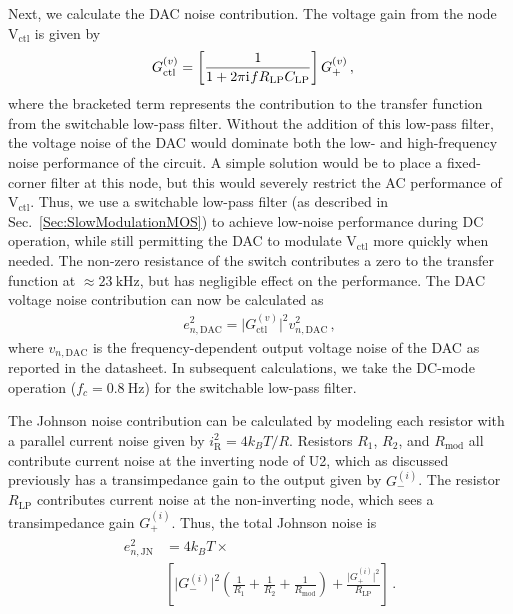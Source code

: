 \documentclass[aip,rsi,reprint]{revtex4-1} %
\newcommand{\iu}{\mathrm{i}\mkern1mu}
\begin{document}
Next, we calculate the DAC noise contribution.
The voltage gain from the node $\text{V}_{\text{ctl}}$ is given by
\begin{align}
\label{Eq:Gdc}
G^{(v)}_{\text{ctl}} &= \left[\frac{1}{1+2\pi \iu f R_\text{LP} C_\text{LP}}\right]G_{+}^{(v)}\,,
\end{align}
where the bracketed term represents the contribution to the transfer function from the switchable low-pass filter.
Without the addition of this low-pass filter, the voltage noise of the DAC would dominate both the low- and high-frequency noise performance of the circuit.
A simple solution would be to place a fixed-corner filter at this node, but this would severely restrict the AC performance of $\text{V}_\text{ctl}$.
Thus, we use a switchable low-pass filter (as described in Sec.~\ref{Sec:SlowModulationMOS}) to achieve low-noise performance during DC operation, while still permitting the DAC to modulate $\text{V}_\text{ctl}$ more quickly when needed.
The non-zero resistance of the switch contributes a zero to the transfer function at $\approx\SI{23}{\kilo\hertz}$, but has negligible effect on the performance.
The DAC voltage noise contribution can now be calculated as 
\begin{align}
e^2_{n,\text{DAC}} = \big|G^{(v)}_{\text{ctl}}\big|^2 v^2_{n,\text{DAC}}\,,
\end{align}
where $v_{n,\text{DAC}}$ is the frequency-dependent output voltage noise of the DAC as reported in the datasheet.\cite{AD56XXRDatasheet} 
In subsequent calculations, we take the DC-mode operation ($f_c = \SI{0.8}{\hertz}$) for the switchable low-pass filter.
 
The Johnson noise contribution can be calculated by modeling each resistor with a parallel current noise given by $i_\text{R}^2 = 4k_B T/R$.
Resistors $R_1$, $R_2$, and $R_\text{mod}$ all contribute current noise at the inverting node of U2, which as discussed previously has a transimpedance gain to the output given by $G_{-}^{(i)}$.
The resistor $R_\text{LP}$ contributes current noise at the non-inverting node, which sees a transimpedance gain $G_{+}^{(i)}$.
Thus, the total Johnson noise is
\begin{align}
\begin{split}
e^2_{n,\text{JN}} &= 4 k_B T \times \\
&\left[ \big|G_{-}^{(i)}\big|^2 \left(\frac{1}{R_1} + \frac{1}{R_2} + \frac{1}{R_\text{mod}} \right) + 
\frac{\big|G_{+}^{(i)}\big|^2}{R_\text{LP}} \right]\,.
\end{split}
\end{align}
\end{document}
